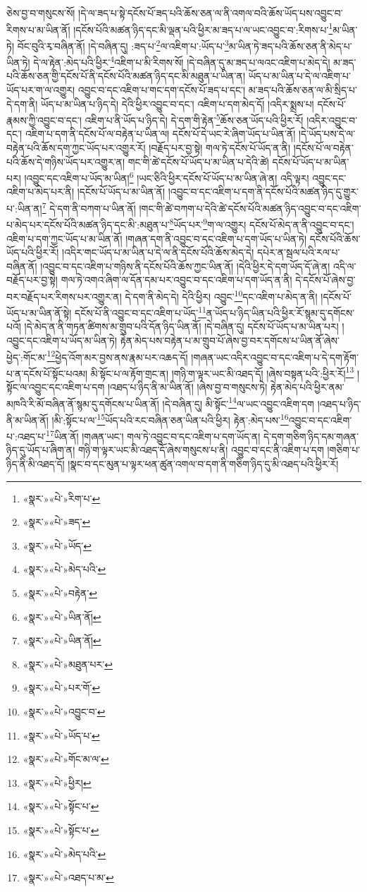 ཅེས་བྱ་བ་གསུངས་སོ། །དེ་ལ་ཟད་པ་སྟེ་དངོས་པོ་ཟད་པའི་ཆོས་ཅན་ལ་ནི་འགལ་བའི་ཆོས་ཡོད་པས་འབྱུང་བ་རིགས་པ་མ་ཡིན་ནོ། །དངོས་པོའི་མཚན་ཉིད་དང་མི་ལྡན་པའི་ཕྱིར་མ་ཟད་པ་ལ་ཡང་འབྱུང་བ་:རིགས་པ་\footnote{«སྣར་»«པེ་»རིག་པ་}མ་ཡིན་ཏེ། བོང་བུའི་རྭ་བཞིན་ནོ། །དེ་བཞིན་དུ། :ཟད་པ་\footnote{«སྣར་»«པེ་»ཟད་}ལ་འཇིག་པ་:ཡོད་པ་\footnote{«སྣར་»«པེ་»ཡོད་}མ་ཡིན་ཏེ་ཟད་པའི་ཆོས་ཅན་ནི་མེད་པ་ཡིན་ཏེ། དེ་ལ་རྟེན་:མེད་པའི་ཕྱིར་\footnote{«སྣར་»«པེ་»མེད་པའི་}འཇིག་པ་མི་རིགས་སོ། །དེ་བཞིན་དུ་མ་ཟད་པ་ལའང་འཇིག་པ་མེད་དེ། མ་ཟད་པའི་ཆོས་ཅན་གྱི་དངོས་པོ་ནི་དངོས་པོའི་མཚན་ཉིད་དང་མི་མཐུན་པ་ཡིན་ན། ཡོད་པ་མ་ཡིན་པ་དེ་ལ་འཇིག་པ་ཡོད་པར་ག་ལ་འགྱུར། འབྱུང་བ་དང་འཇིག་པ་གང་དག་དངོས་པོ་ཟད་པ་དང་། མ་ཟད་པའི་ཆོས་ཅན་ལ་མི་སྲིད་པ་དེ་དག་ནི། ཡོད་པ་མ་ཡིན་པ་ཉིད་དེ། དེའི་ཕྱིར་འབྱུང་བ་དང་། འཇིག་པ་དག་མེད་དོ། །འདིར་སྨྲས་པ། དངོས་པོ་རྣམས་ཀྱི་འབྱུང་བ་དང་། འཇིག་པ་ནི་ཡོད་པ་ཉིད་དེ། དེ་དག་གི་རྟེན་\footnote{«སྣར་»«པེ་»བརྟེན་}ཆོས་ཅན་ཡོད་པའི་ཕྱིར་རོ། །འདིར་འབྱུང་བ་དང་། འཇིག་པ་དག་ནི་དངོས་པོ་ལ་བརྟེན་པ་ཡིན་ལ། དངོས་པོ་དེ་ཡང་རེ་ཞིག་ཡོད་པ་ཡིན་ནོ། །དེ་ཡོད་པས་དེ་ལ་བརྟེན་པའི་ཆོས་དག་ཀྱང་ཡོད་པར་འགྱུར་རོ། །བརྗོད་པར་བྱ་སྟེ། གལ་ཏེ་དངོས་པོ་ཡོད་ན་ནི། །དངོས་པོ་ལ་བརྟེན་པའི་ཆོས་དེ་གཉིས་ཡོད་པར་འགྱུར་ན། གང་གི་ཚེ་དངོས་པོ་ཡོད་པ་མ་ཡིན་པ་དེའི་ཚེ། དངོས་པོ་ཡོད་པ་མ་ཡིན་པར། །འབྱུང་དང་འཇིག་པ་ཡོད་མ་ཡིན།\footnote{«སྣར་»«པེ་»ཡིན་ནོ།} །ཡང་ཅིའི་ཕྱིར་དངོས་པོ་ཡོད་པ་མ་ཡིན་ཞེ་ན། འདི་ལྟར། འབྱུང་དང་འཇིག་པ་མེད་པར་ནི། །དངོས་པོ་ཡོད་པ་མ་ཡིན་ནོ། །འབྱུང་བ་དང་འཇིག་པ་དག་ནི་དངོས་པོའི་མཚན་ཉིད་དུ་གྱུར་པ་:ཡིན་ན།\footnote{«སྣར་»«པེ་»ཡིན་ནོ།} དེ་དག་ནི་བཀག་པ་ཡིན་ནོ། །གང་གི་ཚེ་བཀག་པ་དེའི་ཚེ་དངོས་པོའི་མཚན་ཉིད་འབྱུང་བ་དང་འཇིག་པ་མེད་པར་དངོས་པོའི་མཚན་ཉིད་དང་མི་:མཐུན་པ་\footnote{«སྣར་»«པེ་»མཐུན་པར་}ཡོད་པར་\footnote{«སྣར་»«པེ་»པར་གོ་}ག་ལ་འགྱུར། དངོས་པོ་མེད་ན་ནི་འབྱུང་བ་དང་། འཇིག་པ་དག་ཀྱང་ཡོད་པ་མ་ཡིན་ནོ། །གཞན་དག་ནི་འབྱུང་བ་དང་འཇིག་པ་དག་ཡོད་པ་ཡིན་ཏེ། དངོས་པོའི་ཆོས་ཡོད་པའི་ཕྱིར་རོ། །འདིར་གང་ཡོད་པ་མ་ཡིན་པ་དེ་ལ་ནི་དངོས་པོའི་ཆོས་མེད་དེ། དཔེར་ན་སྦལ་པའི་རལ་པ་བཞིན་ནོ། །འབྱུང་བ་དང་འཇིག་པ་གཉིས་ནི་དངོས་པོའི་ཆོས་ཀྱང་ཡིན་ནོ། །དེའི་ཕྱིར་དེ་དག་ཡོད་དོ་ཞེ་ན། འདི་ལ་བརྗོད་པར་བྱ་སྟེ། གལ་ཏེ་འགའ་ཞིག་ལ་དོན་དམ་པར་འབྱུང་བ་དང་འཇིག་པ་དག་ཡོད་ན་ནི། དེ་དངོས་པོ་ཞེས་བྱ་བར་བརྗོད་པར་རིགས་པར་འགྱུར་ན། དེ་དག་ནི་མེད་དེ། དེའི་ཕྱིར། འབྱུང་\footnote{«སྣར་»«པེ་»འབྱུང་བ་}དང་འཇིག་པ་མེད་ན་ནི། །དངོས་པོ་ཡོད་པ་མ་ཡིན་ནོ་སྟེ། དངོས་པོ་ནི་འབྱུང་བ་དང་འཇིག་པ་ཡོད་\footnote{«སྣར་»«པེ་»ཡོད་པ་}ན་ཡོད་པ་ཉིད་ཡིན་པའི་ཕྱིར་རོ་སྙམ་དུ་དགོངས་པའོ། །དེ་མེད་ན་ནི་གཏན་ཚིགས་མ་གྲུབ་པའི་དོན་ཉིད་ཡིན་ནོ། །དེ་བཞིན་དུ། དངོས་པོ་ཡོད་པ་མ་ཡིན་པར། །འབྱུང་དང་འཇིག་པ་ཡོད་མ་ཡིན་ཏེ། རྟེན་མེད་པས་བརྟེན་པ་མ་གྲུབ་པོ་ཞེས་བྱ་བར་དགོངས་པ་ཡིན་ནོ་ཞེས་ཕྱེད་:གོང་མ་\footnote{«སྣར་»«པེ་»གོང་མ་ལ་}ཕྱེད་འོག་མར་བྱས་ནས་རྣམ་པར་འཆད་དོ། །གཞན་ཡང་འདིར་འབྱུང་བ་དང་འཇིག་པ་དེ་དག་རྟོག་པ་ན་དངོས་པོ་སྟོང་པའམ། མི་སྟོང་པ་ལ་རྟོག་གྲང་ན། །གཉི་ག་ལྟར་ཡང་མི་འཐད་དོ། །ཞེས་བསྟན་པའི་:ཕྱིར་རོ།\footnote{«སྣར་»«པེ་»ཕྱིར།} །སྟོང་ལ་འབྱུང་དང་འཇིག་པ་དག །འཐད་པ་ཉིད་ནི་མ་ཡིན་ནོ། །ཞེས་བྱ་བ་གསུངས་ཏེ། རྟེན་མེད་པའི་ཕྱིར་ནམ་མཁའི་རི་མོ་བཞིན་ནོ་སྙམ་དུ་དགོངས་པ་ཡིན་ནོ། །དེ་བཞིན་དུ། མི་སྟོང་\footnote{«སྣར་»«པེ་»སྟོང་པ་}ལ་ཡང་འབྱུང་འཇིག་དག །འཐད་པ་ཉིད་ནི་མ་ཡིན་ནོ། །མི་:སྟོང་པ་ལ་\footnote{«སྣར་»«པེ་»སྟོང་པ་}ཡོད་པའི་རང་བཞིན་ཅན་ཡིན་པའི་ཕྱིར། རྟེན་:མེད་པས་\footnote{«སྣར་»«པེ་»མེད་པའི་}འབྱུང་བ་དང་འཇིག་པ་:འཐད་པ་\footnote{«སྣར་»«པེ་»འཐད་པ་མ་}ཡིན་ནོ། །གཞན་ཡང་། གལ་ཏེ་འབྱུང་བ་དང་འཇིག་པ་དག་ཡོད་ན། དེ་དག་གཅིག་ཉིད་དམ་གཞན་ཉིད་དུ་ཡོད་པ་ཞིག་ན། གཉི་ག་ལྟར་ཡང་མི་འཐད་དོ་ཞེས་གསུངས་པ་ནི། འབྱུང་བ་དང་ནི་འཇིག་པ་དག །གཅིག་པ་ཉིད་ནི་མི་འཐད་དོ། །སྣང་བ་དང་མུན་པ་ལྟར་ཕན་ཚུན་འགལ་བ་དག་ནི་གཅིག་ཉིད་དུ་མི་འཐད་པའི་ཕྱིར་རོ། 